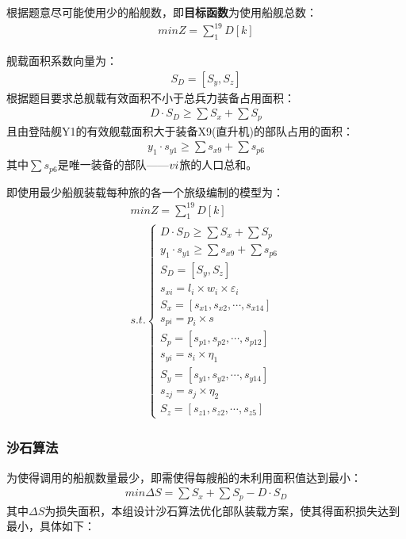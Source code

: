 \documentclass{whutmod}
\begin{document}
	    根据题意尽可能使用少的船舰数，即\textbf{目标函数}为使用船舰总数：
	     \begin{gather}
	    min Z=\sum _{1}^{19}D[k]
	  \end{gather}
	    
	    
	   舰载面积系数向量为：
	    \begin{gather}
	    S_{D}=[S_{y}, S_{z}]
    	\end{gather}
    	根据题目要求总舰载有效面积不小于总兵力装备占用面积：
    	 \begin{gather}
    	 D\cdot S_{D}\geq \sum  S_{x} + \sum  S_{p}
    	 \end{gather}
    	 且由登陆舰Y1的有效舰载面积大于装备X9(直升机)的部队占用的面积：
    	  \begin{gather}
    	 y_{1}\cdot s_{y1}\geq \sum s_{x9}+ \sum  s_{p6}
    	 \end{gather}
    	 其中$\sum  s_{p6}$是唯一装备的部队——$\uppercase\expandafter{\romannumeral6}$旅的人口总和。
    	 
    	 即使用最少船舰装载每种旅的各一个旅级编制的模型为：
    	  \begin{gather}
    	 min Z=\sum _{1}^{19}D[k]\\ 
    	  s.t.\left\{\begin{matrix}	 D\cdot S_{D}\geq \sum  S_{x} + \sum  S_{p}
    	 \\ y_{1}\cdot s_{y1}\geq \sum s_{x9}+ \sum  s_{p6}
    	 \\S_{D}=[S_{y}, S_{z}]
    	 \\ s_{xi}=l_{i}\times w_{i} \times \varepsilon _{i}
    	 \\S_{x}=[s_{x1},s_{x2},\cdots,s_{x14}]
    	 \\s_{pi}=p_{i}\times s
    	 \\S_{p}=[s_{p1},s_{p2},\cdots,s_{p12}]
    	 \\     s_{yi}=s_{i}\times \eta_{1}
    	 \\   S_{y}=[s_{y1},s_{y2},\cdots,s_{y14}]
    	 \\      s_{zj}=s_{j}\times \eta_{2}
    	 \\ S_{z}=[s_{z1},s_{z2},\cdots,s_{z5}]
    	 \end{matrix}\right. 
     	 \end{gather}
    	  \subsubsection{沙石算法}
		为使得调用的船舰数量最少，即需使得每艘船的未利用面积值达到最小：
	    \begin{gather*}
		min \Delta S= \sum  S_{x} + \sum  S_{p}-D\cdot S_{D} 
		\end{gather*}
	其中$\Delta S$为损失面积，本组设计沙石算法优化部队装载方案，使其得面积损失达到最小，具体如下：
\end{document}
